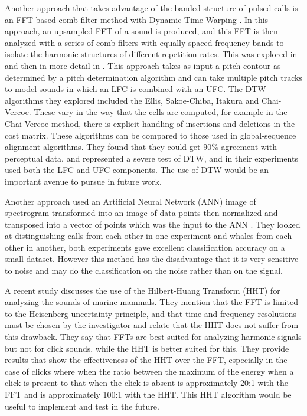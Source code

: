 Another approach that takes advantage of the banded structure of
pulsed calls is an FFT based comb filter method with Dynamic Time
Warping  \cite{brown2006classifying}.  In this approach, an upsampled
FFT of a sound is produced, and this FFT is then analyzed with a
series of comb filters with equally spaced frequency bands to isolate
the harmonic structures of different repetition rates. This was
explored in \cite{brown2006classifying} and then in more detail in
\cite{brown2007dtw}.  This approach takes as input a pitch contour as
determined by a pitch determination algorithm and can take multiple
pitch tracks to model sounds in which an LFC is combined with an UFC.
The DTW algorithms they explored included the Ellis, Sakoe-Chiba,
Itakura and Chai-Vercoe.  These vary in the way that the cells are
computed, for example in the Chai-Vercoe method, there is explicit
handling of insertions and deletions in the cost matrix.  These
algorithms can be compared to those used in global-sequence alignment
algorithms.  They found that they could get 90\% agreement with
perceptual data, and represented a severe test of DTW, and in their
experiments used both the LFC and UFC components.  The use of DTW
would be an important avenue to pursue in future work.

Another approach used an Artificial Neural Network (ANN) image of
spectrogram transformed into an image of data points then normalized
and transposed into a vector of points which was the input to the ANN
\cite{gaetz1993neural}.  They looked at distinguishing calls from each
other in one experiment and whales from each other in another, both
experiments gave excellent classification accuracy on a small dataset.
However this method has the disadvantage that it is very sensitive to
noise and may do the classification on the noise rather than on the
signal.

A recent study \cite{adam2006hilbert} discusses the use of the
Hilbert-Huang Transform (HHT) for analyzing the sounds of marine
mammals.  They mention that the FFT is limited to the Heisenberg
uncertainty principle, and that time and frequency resolutions must be
chosen by the investigator and relate that the HHT does not suffer
from this drawback.  They say that FFTs are best suited for analyzing
harmonic signals but not for click sounds, while the HHT is better
suited for this.  They provide results that show the effectiveness of
the HHT over the FFT, especially in the case of clicks where when the
ratio between the maximum of the energy when a click is present to
that when the click is absent is approximately 20:1 with the FFT and
is approximately 100:1 with the HHT.  This HHT algorithm would be
useful to implement and test in the future.

